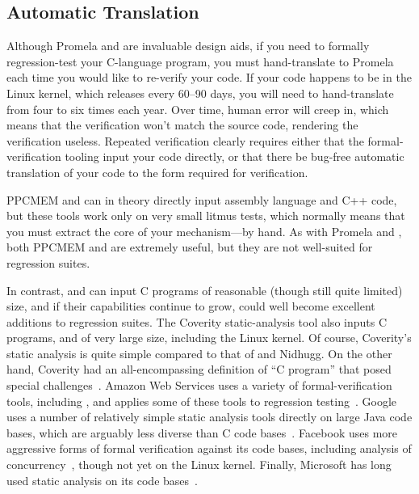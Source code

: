 \subsection{Automatic Translation}
\label{sec:future:Automatic Translation}

Although Promela and 
are invaluable design aids, if you need to formally regression-test
your C-language program, you must hand-translate to Promela each time
you would like to re-verify your code.
If your code happens to be in the Linux kernel, which releases every
60--90 days, you will need to hand-translate from four to six times
each year.
Over time, human error will creep in, which means that the verification
won't match the source code, rendering the verification useless.
Repeated verification clearly requires either that the formal-verification
tooling input your code directly, or that there be bug-free automatic
translation of your code to the form required for verification.

PPCMEM and  can in theory directly input assembly language
and C++ code, but these tools work only on very small litmus tests,
which normally means that you must extract the core of your
mechanism---by hand.
As with Promela and , both PPCMEM and  are
extremely useful, but they are not well-suited for regression suites.

In contrast,  and  can input
C programs of reasonable
(though still quite limited) size, and if their capabilities continue
to grow, could well become excellent additions to regression suites.
The Coverity static-analysis tool also inputs C programs, and of very
large size, including the Linux kernel.
Of course, Coverity's static analysis is quite simple compared to that
of  and Nidhugg.
On the other hand, Coverity had an all-encompassing definition of
``C program'' that posed special challenges~\cite{AlBessey2010BillionLoCLater}.
Amazon Web Services uses a variety of formal-verification tools,
including , and applies some of these tools to regression
testing~\cite{ByronCook2018FormalAmazon}.
Google uses a number of relatively simple static analysis tools directly
on large Java code bases, which are arguably less diverse than C code
bases~\cite{CaitlinSadowski2018staticAnalysisGoogle}.
Facebook uses more aggressive forms of formal verification against its
code bases, including analysis of concurrency~\cite{DinoDistefano2019FBstaticAnalysis,PeterWOHearn2019incorrectnessLogic},
though not yet on the Linux kernel.
Finally, Microsoft has long used static analysis on its code
bases~\cite{JamesRLarus2004RightingSoftware}.

